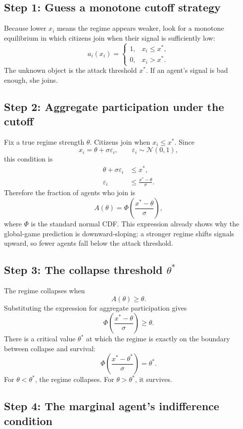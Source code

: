 \documentclass[11pt]{article}
\begin{document}
\subsection{Step 1: Guess a monotone cutoff strategy}

Because lower $x_i$ means the regime appears weaker, look for a monotone equilibrium in which citizens join when their signal is sufficiently low:
\[
  a_i(x_i)=
  \begin{cases}
  1, & x_i\le x^*,\\
  0, & x_i>x^*.
  \end{cases}
\]
The unknown object is the attack threshold $x^*$. If an agent's signal is bad enough, she joins.

\subsection{Step 2: Aggregate participation under the cutoff}

Fix a true regime strength $\theta$. Citizens join when $x_i\le x^*$. Since
\[
  x_i=\theta+\sigma\varepsilon_i,
  \qquad \varepsilon_i\sim\mathcal{N}(0,1),
\]
this condition is
\begin{align*}
  \theta+\sigma\varepsilon_i&\le x^*,\\
  \varepsilon_i&\le \frac{x^*-\theta}{\sigma}.
\end{align*}
Therefore the fraction of agents who join is
\[
  A(\theta)=\Phi\left(\frac{x^* - \theta}{\sigma}\right),
\]
where $\Phi$ is the standard normal CDF. This expression already shows why the global-game prediction is downward-sloping: a stronger regime shifts signals upward, so fewer agents fall below the attack threshold.

\subsection{Step 3: The collapse threshold $\theta^*$}

The regime collapses when
\[
  A(\theta)\ge \theta.
\]
Substituting the expression for aggregate participation gives
\[
  \Phi\left(\frac{x^*-\theta}{\sigma}\right)\ge \theta.
\]
There is a critical value $\theta^*$ at which the regime is exactly on the boundary between collapse and survival:
\[
  \Phi\left(\frac{x^*-\theta^*}{\sigma}\right)=\theta^*.
\]
For $\theta<\theta^*$, the regime collapses. For $\theta>\theta^*$, it survives.

\subsection{Step 4: The marginal agent's indifference condition}
\end{document}
